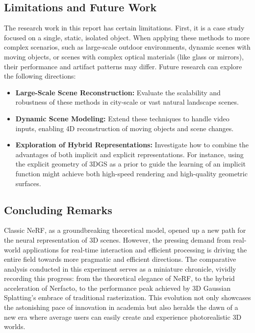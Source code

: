 \documentclass[11pt]{article}
\begin{document}
\subsection{Limitations and Future Work}
The research work in this report has certain limitations. First, it is a case study focused on a single, static, isolated object. When applying these methods to more complex scenarios, such as large-scale outdoor environments, dynamic scenes with moving objects, or scenes with complex optical materials (like glass or mirrors), their performance and artifact patterns may differ.
Future research can explore the following directions:
\begin{itemize}
    \item \textbf{Large-Scale Scene Reconstruction:} Evaluate the scalability and robustness of these methods in city-scale or vast natural landscape scenes.
    \item \textbf{Dynamic Scene Modeling:} Extend these techniques to handle video inputs, enabling 4D reconstruction of moving objects and scene changes.
    \item \textbf{Exploration of Hybrid Representations:} Investigate how to combine the advantages of both implicit and explicit representations. For instance, using the explicit geometry of 3DGS as a prior to guide the learning of an implicit function might achieve both high-speed rendering and high-quality geometric surfaces.
\end{itemize}

\subsection{Concluding Remarks}
Classic NeRF, as a groundbreaking theoretical model, opened up a new path for the neural representation of 3D scenes. However, the pressing demand from real-world applications for real-time interaction and efficient processing is driving the entire field towards more pragmatic and efficient directions. The comparative analysis conducted in this experiment serves as a miniature chronicle, vividly recording this progress: from the theoretical elegance of NeRF, to the hybrid acceleration of Nerfacto, to the performance peak achieved by 3D Gaussian Splatting's embrace of traditional rasterization. This evolution not only showcases the astonishing pace of innovation in academia but also heralds the dawn of a new era where average users can easily create and experience photorealistic 3D worlds.

\newpage
\appendix
\end{document}
